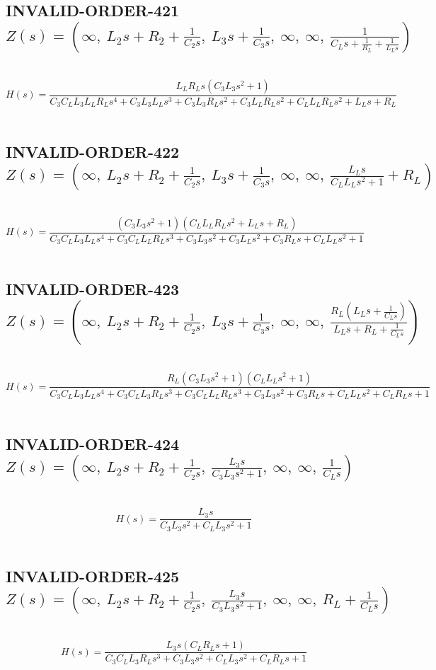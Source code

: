 \documentclass{article}
\begin{document}
\subsection{INVALID-ORDER-421 $Z(s) = \left( \infty, \  L_{2} s + R_{2} + \frac{1}{C_{2} s}, \  L_{3} s + \frac{1}{C_{3} s}, \  \infty, \  \infty, \  \frac{1}{C_{L} s + \frac{1}{R_{L}} + \frac{1}{L_{L} s}}\right)$ } \ 
\textbf{\[H(s) = \frac{L_{L} R_{L} s \left(C_{3} L_{3} s^{2} + 1\right)}{C_{3} C_{L} L_{3} L_{L} R_{L} s^{4} + C_{3} L_{3} L_{L} s^{3} + C_{3} L_{3} R_{L} s^{2} + C_{3} L_{L} R_{L} s^{2} + C_{L} L_{L} R_{L} s^{2} + L_{L} s + R_{L}}\] } \ 
\subsection{INVALID-ORDER-422 $Z(s) = \left( \infty, \  L_{2} s + R_{2} + \frac{1}{C_{2} s}, \  L_{3} s + \frac{1}{C_{3} s}, \  \infty, \  \infty, \  \frac{L_{L} s}{C_{L} L_{L} s^{2} + 1} + R_{L}\right)$ } \ 
\textbf{\[H(s) = \frac{\left(C_{3} L_{3} s^{2} + 1\right) \left(C_{L} L_{L} R_{L} s^{2} + L_{L} s + R_{L}\right)}{C_{3} C_{L} L_{3} L_{L} s^{4} + C_{3} C_{L} L_{L} R_{L} s^{3} + C_{3} L_{3} s^{2} + C_{3} L_{L} s^{2} + C_{3} R_{L} s + C_{L} L_{L} s^{2} + 1}\] } \ 
\subsection{INVALID-ORDER-423 $Z(s) = \left( \infty, \  L_{2} s + R_{2} + \frac{1}{C_{2} s}, \  L_{3} s + \frac{1}{C_{3} s}, \  \infty, \  \infty, \  \frac{R_{L} \left(L_{L} s + \frac{1}{C_{L} s}\right)}{L_{L} s + R_{L} + \frac{1}{C_{L} s}}\right)$ } \ 
\textbf{\[H(s) = \frac{R_{L} \left(C_{3} L_{3} s^{2} + 1\right) \left(C_{L} L_{L} s^{2} + 1\right)}{C_{3} C_{L} L_{3} L_{L} s^{4} + C_{3} C_{L} L_{3} R_{L} s^{3} + C_{3} C_{L} L_{L} R_{L} s^{3} + C_{3} L_{3} s^{2} + C_{3} R_{L} s + C_{L} L_{L} s^{2} + C_{L} R_{L} s + 1}\] } \ 
\subsection{INVALID-ORDER-424 $Z(s) = \left( \infty, \  L_{2} s + R_{2} + \frac{1}{C_{2} s}, \  \frac{L_{3} s}{C_{3} L_{3} s^{2} + 1}, \  \infty, \  \infty, \  \frac{1}{C_{L} s}\right)$ } \ 
\textbf{\[H(s) = \frac{L_{3} s}{C_{3} L_{3} s^{2} + C_{L} L_{3} s^{2} + 1}\] } \ 
\subsection{INVALID-ORDER-425 $Z(s) = \left( \infty, \  L_{2} s + R_{2} + \frac{1}{C_{2} s}, \  \frac{L_{3} s}{C_{3} L_{3} s^{2} + 1}, \  \infty, \  \infty, \  R_{L} + \frac{1}{C_{L} s}\right)$ } \ 
\textbf{\[H(s) = \frac{L_{3} s \left(C_{L} R_{L} s + 1\right)}{C_{3} C_{L} L_{3} R_{L} s^{3} + C_{3} L_{3} s^{2} + C_{L} L_{3} s^{2} + C_{L} R_{L} s + 1}\] } \ 
\end{document}
